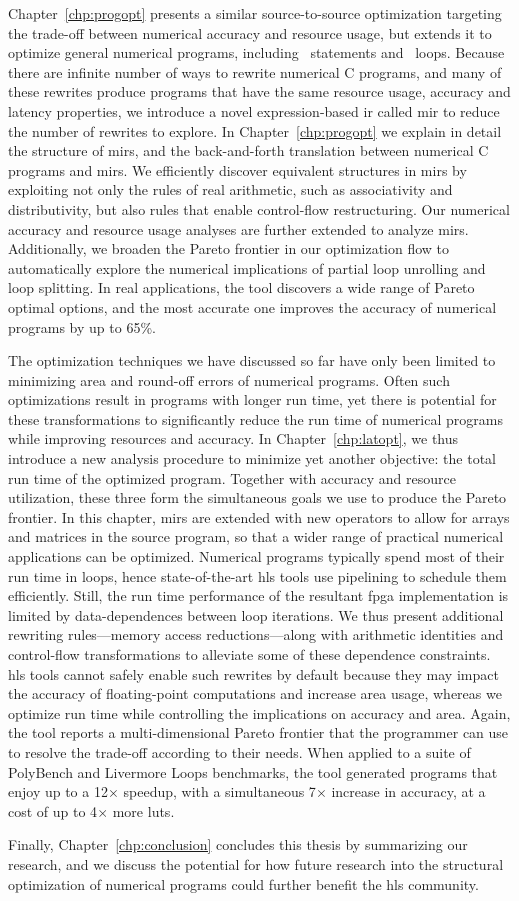 Chapter~\ref{chp:progopt} presents a similar source-to-source optimization
targeting the trade-off between numerical accuracy and resource usage, but
extends it to optimize general numerical programs, including \iflit~statements
and \whilelit~loops.  Because there are infinite number of ways to rewrite
numerical C programs, and many of these rewrites produce programs that have
the same resource usage, accuracy and latency properties, we introduce a novel
expression-based \gls{ir} called \gls{mir} to reduce the number of rewrites to
explore.  In Chapter~\ref{chp:progopt} we explain in detail the structure of
\glspl{mir}, and the back-and-forth translation between numerical C programs
and \glspl{mir}.  We efficiently discover equivalent structures in \glspl{mir}
by exploiting not only the rules of real arithmetic, such as associativity and
distributivity, but also rules that enable control-flow restructuring.  Our
numerical accuracy and resource usage analyses are further extended to analyze
\glspl{mir}.  Additionally, we broaden the Pareto frontier in our optimization
flow to automatically explore the numerical implications of partial loop
unrolling and loop splitting.  In real applications, the tool discovers a
wide range of Pareto optimal options, and the most accurate one improves the
accuracy of numerical programs by up to 65\%.

The optimization techniques we have discussed so far have only been limited
to minimizing area and round-off errors of numerical programs.  Often such
optimizations result in programs with longer run time, yet there is potential
for these transformations to significantly reduce the run time of numerical
programs while improving resources and accuracy.  In Chapter~\ref{chp:latopt},
we thus introduce a new analysis procedure to minimize yet another objective:
the total run time of the optimized program.  Together with accuracy and
resource utilization, these three form the simultaneous goals we use to
produce the Pareto frontier.  In this chapter, \glspl{mir} are extended
with new operators to allow for arrays and matrices in the source program,
so that a wider range of practical numerical applications can be optimized.
Numerical programs typically spend most of their run time in loops, hence
state-of-the-art \gls{hls} tools use pipelining to schedule them efficiently.
Still, the run time performance of the resultant \gls{fpga} implementation
is limited by data-dependences between loop iterations.  We thus present
additional rewriting rules---memory access reductions---along with arithmetic
identities and control-flow transformations to alleviate some of these
dependence constraints.  \Gls{hls} tools cannot safely enable such rewrites by
default because they may impact the accuracy of floating-point computations
and increase area usage, whereas we optimize run time while controlling the
implications on accuracy and area.  Again, the tool reports a multi-dimensional
Pareto frontier that the programmer can use to resolve the trade-off according
to their needs.  When applied to a suite of PolyBench and Livermore Loops
benchmarks, the tool generated programs that enjoy up to a 12$\times$ speedup,
with a simultaneous 7$\times$ increase in accuracy, at a cost of up to
4$\times$ more \glspl{lut}.

Finally, Chapter~\ref{chp:conclusion} concludes this thesis by summarizing
our research, and we discuss the potential for how future research into the
structural optimization of numerical programs could further benefit the
\gls{hls} community.
